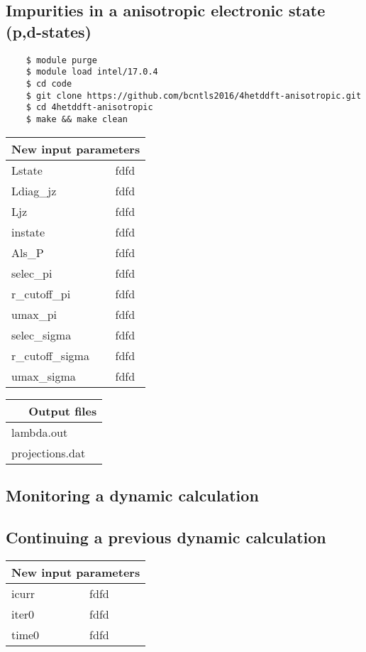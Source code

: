 \documentclass[10pt,a4paper]{article}
\begin{document}
	\subsection{Impurities in a anisotropic electronic state (p,d-states)}
	\begin{verbatim}
	$ module purge
	$ module load intel/17.0.4
	$ cd code
	$ git clone https://github.com/bcntls2016/4hetddft-anisotropic.git
	$ cd 4hetddft-anisotropic
	$ make && make clean
	\end{verbatim}

	\begin{center}
	\begin{tabular}{l|p{8.0cm}}
		\multicolumn{2}{r}{\textbf{New input parameters}} \\
		\hline\hline
			Lstate	& fdfd \\
			Ldiag\_jz	& fdfd \\
			Ljz	& fdfd \\
			instate	& fdfd \\
			Als\_P	& fdfd \\
			selec\_pi	& fdfd \\
			r\_cutoff\_pi	& fdfd \\
			umax\_pi	& fdfd \\
			selec\_sigma	& fdfd \\
			r\_cutoff\_sigma	& fdfd \\
			umax\_sigma	& fdfd \\
		\end{tabular}
	\end{center}

	\begin{center}
	\begin{tabular}{l|p{7.5cm}}
		\multicolumn{2}{r}{\textbf{Output files}} \\
		\hline\hline
		lambda.out	& \\
		projections.dat	&	\\
	\end{tabular}
\end{center}

\subsection{Monitoring a dynamic calculation}

\subsection{Continuing a previous dynamic calculation}
	\begin{center}
		\begin{tabular}{l|p{8.0cm}}
		\multicolumn{2}{r}{\textbf{New input parameters}} \\
		\hline\hline
			icurr	& fdfd \\
			iter0	& fdfd \\
			time0	& fdfd \\
	\end{tabular}
\end{center}
\end{document}
